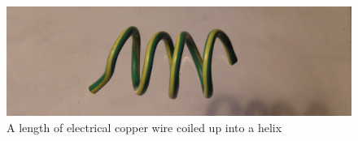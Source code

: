 %

\begin{figure}[!h]
  \centering
  \includegraphics[width=1.1\textwidth]{fig1.jpg}
  \caption{A length of electrical copper wire coiled up into a helix}
  \label{fig:1}
\end{figure}

%

